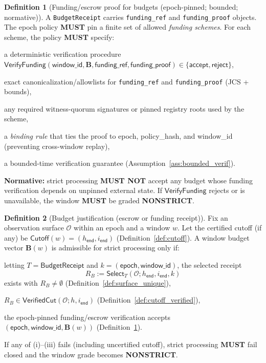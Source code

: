 \documentclass[11pt]{article}
\newcommand{\MUST}{\textbf{MUST}}
\newcommand{\MUSTNOT}{\textbf{MUST NOT}}
\newcommand{\code}[1]{\texttt{#1}}
\newcommand{\1}{\mathbf{1}}
\theoremstyle{definition}
\newtheorem{definition}{Definition}
\theoremstyle{plain}
\begin{document}
\begin{definition}[Funding/escrow proof for budgets (epoch-pinned; bounded; normative)]
\label{def:funding_proof}
A \code{BudgetReceipt} carries \code{funding\_ref} and \code{funding\_proof} objects.
The epoch policy \MUST{} pin a finite set of allowed \emph{funding schemes}. For each scheme, the policy \MUST{} specify:
\begin{tightitemize}
\item a deterministic verification procedure $\mathsf{VerifyFunding}(\textsf{window\_id},\mathbf{B},\textsf{funding\_ref},\textsf{funding\_proof})\in\{\textsf{accept},\textsf{reject}\}$,
\item exact canonicalization/allowlists for \code{funding\_ref} and \code{funding\_proof} (JCS + bounds),
\item any required witness-quorum signatures or pinned registry roots used by the scheme,
\item a \emph{binding rule} that ties the proof to \textsf{epoch}, \textsf{policy\_hash}, and \textsf{window\_id} (preventing cross-window replay),
\item a bounded-time verification guarantee (Assumption~\ref{ass:bounded_verif}).
\end{tightitemize}
\textbf{Normative:} strict processing \MUSTNOT{} accept any budget whose funding verification depends on unpinned external state. If $\mathsf{VerifyFunding}$ rejects or is unavailable, the window \MUST{} be graded \textbf{NONSTRICT}.
\end{definition}


\begin{definition}[Budget justification (escrow or funding receipt)]
\label{def:budget_escrow}
Fix an observation surface $\mathcal{O}$ within an epoch and a window $w$.
Let the certified cutoff (if any) be $\textsf{Cutoff}(w)=(h_{\textsf{end}},i_{\textsf{end}})$ (Definition~\ref{def:cutoff}).
A window budget vector $\mathbf{B}(w)$ is admissible for strict processing only if:
\begin{tightitemize}
\item[(i)] letting $T=\textsf{BudgetReceipt}$ and $k=(\textsf{epoch},\textsf{window\_id})$, the selected receipt
\[
R_B := \mathsf{Select}_T(\mathcal{O};h_{\textsf{end}},i_{\textsf{end}},k)
\]
exists with $R_B\neq\emptyset$ (Definition~\ref{def:surface_unique}),
\item[(ii)] $R_B\in\mathsf{VerifiedCut}(\mathcal{O};h,i_{\textsf{end}})$ (Definition~\ref{def:cutoff_verified}),
\item[(iii)] the epoch-pinned funding/escrow verification accepts $(\textsf{epoch},\textsf{window\_id},\mathbf{B}(w))$ (Definition~\ref{def:funding_proof}).
\end{tightitemize}
If any of (i)--(iii) fails (including uncertified cutoff), strict processing \MUST{} fail closed and the window grade becomes \textbf{NONSTRICT}.
\end{definition}
\end{document}
